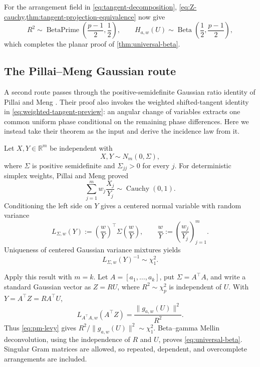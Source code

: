 \documentclass[11pt]{article}
\numberwithin{equation}{section}
\theoremstyle{thmstyleone}%
\theoremstyle{thmstyletwo}%
\let\cref\autoref
\newcommand{\R}{\mathbb R}
\newcommand{\Beta}{\operatorname{Beta}}
\newcommand{\BetaPrime}{\operatorname{BetaPrime}}
\newcommand{\Cauchy}{\operatorname{Cauchy}}
\begin{document}
For the arrangement field in \cref{eq:tangent-decomposition},
\cref{eq:Z-cauchy,thm:tangent-projection-equivalence} now give
\[
  R^2\sim\BetaPrime\!\left(\frac{p-1}{2},\frac12\right),
  \qquad
  H_{a,w}(U)\sim\Beta\!\left(\frac12,\frac{p-1}{2}\right),
\]
which completes the planar proof of \cref{thm:universal-beta}.

\subsection{The Pillai--Meng Gaussian route}
\label{sec:pm-input}

A second route passes through the positive-semidefinite Gaussian ratio
identity of Pillai and Meng \cite{pillai-meng-2016}.  Their proof also invokes
the weighted shifted-tangent identity in \cref{eq:weighted-tangent-preview}:
an angular change of variables extracts one common uniform phase conditional
on the remaining phase differences.  Here we instead take their theorem as
the input and derive the incidence law from it.

Let \(X,Y\in\R^m\) be independent with
\[
  X,Y\sim N_m(0,\Sigma),
\]
where \(\Sigma\) is positive semidefinite and
\(\Sigma_{jj}>0\) for every \(j\).  For deterministic simplex weights,
Pillai and Meng proved
\begin{equation}
  \sum_{j=1}^m w_j\frac{X_j}{Y_j}
  \sim\Cauchy(0,1).
  \label{eq:pm-cauchy}
\end{equation}
Conditioning the left side on \(Y\) gives a centered normal variable with
random variance
\begin{equation}
  L_{\Sigma,w}(Y)
  :=
  \left(\frac{w}{Y}\right)^{\!\top}
  \Sigma
  \left(\frac{w}{Y}\right),
  \qquad
  \frac{w}{Y}:=\left(\frac{w_j}{Y_j}\right)_{j=1}^m.
  \label{eq:levy-functional}
\end{equation}
Uniqueness of centered Gaussian variance mixtures yields
\begin{equation}
  L_{\Sigma,w}(Y)^{-1}\sim\chi_1^2.
  \label{eq:pm-levy}
\end{equation}

Apply this result with \(m=k\).  Let \(A=[a_1,\ldots,a_k]\), put
\(\Sigma=A^\top A\), and write a standard Gaussian vector as \(Z=RU\), where
\(R^2\sim\chi_p^2\) is independent of \(U\).  With
\(Y=A^\top Z=RA^\top U\),
\[
  L_{A^\top A,w}(A^\top Z)
  =
  \frac{\|g_{a,w}(U)\|^2}{R^2}.
\]
Thus \cref{eq:pm-levy} gives
\(R^2/\|g_{a,w}(U)\|^2\sim\chi_1^2\).  Beta--gamma Mellin
deconvolution, using the independence of \(R\) and \(U\), proves
\cref{eq:universal-beta}.  Singular Gram matrices are allowed, so repeated,
dependent, and overcomplete arrangements are included.
\end{document}
